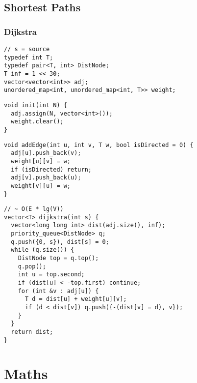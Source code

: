 \documentclass[twoside]{article}
\begin{document}
\begin{multicols*}{2}
\subsectionfont{\bfseries\sffamily\centering\LARGE}
\vspace{0em}
\subsection*{Shortest Paths}
\vspace{2em}
\subsubsectionfont{\large\bfseries\sffamily\underline}
\subsubsection*{Dijkstra}
\begin{verbatim}
// s = source
typedef int T;
typedef pair<T, int> DistNode;
T inf = 1 << 30;
vector<vector<int>> adj;
unordered_map<int, unordered_map<int, T>> weight;
\end{verbatim}
\vspace{-12pt}
\begin{verbatim}
void init(int N) {
  adj.assign(N, vector<int>());
  weight.clear();
}
\end{verbatim}
\vspace{-12pt}
\begin{verbatim}
void addEdge(int u, int v, T w, bool isDirected = 0) {
  adj[u].push_back(v);
  weight[u][v] = w;
  if (isDirected) return;
  adj[v].push_back(u);
  weight[v][u] = w;
}
\end{verbatim}
\vspace{-12pt}
\begin{verbatim}
// ~ O(E * lg(V))
vector<T> dijkstra(int s) {
  vector<long long int> dist(adj.size(), inf);
  priority_queue<DistNode> q;
  q.push({0, s}), dist[s] = 0;
  while (q.size()) {
    DistNode top = q.top();
    q.pop();
    int u = top.second;
    if (dist[u] < -top.first) continue;
    for (int &v : adj[u]) {
      T d = dist[u] + weight[u][v];
      if (d < dist[v]) q.push({-(dist[v] = d), v});
    }
  }
  return dist;
}
\end{verbatim}

\sectionfont{\bfseries\sffamily\centering\Huge}
\vspace{1em}
\section*{Maths}
\vspace{3em}
\subsectionfont{\bfseries\sffamily\centering\LARGE}
\vspace{0em}

\end{multicols*}
\end{document}
